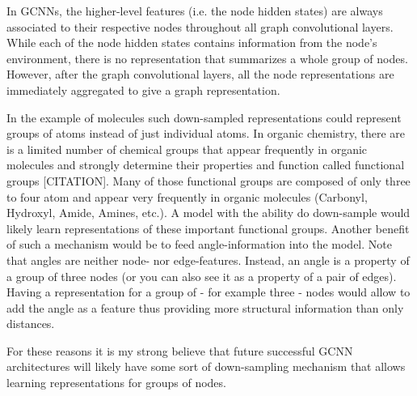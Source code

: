 In GCNNs, the higher-level features (i.e. the node hidden states) are always associated to their respective nodes throughout all graph convolutional layers. While each of the node hidden states contains information from the node's environment, there is no representation that summarizes a whole group of nodes. However, after the graph convolutional layers, all the node representations are immediately aggregated to give a graph representation.

In the example of molecules such down-sampled representations could represent groups of atoms instead of just individual atoms. In organic chemistry, there are is a limited number of chemical groups that appear frequently in organic molecules and strongly determine their properties and function called functional groups [CITATION]. Many of those functional groups are composed of only three to four atom and appear very frequently in organic molecules (Carbonyl, Hydroxyl, Amide, Amines, etc.). A model with the ability do down-sample would likely learn representations of these important functional groups. Another benefit of such a mechanism would be to feed angle-information into the model. Note that angles are neither node- nor edge-features. Instead, an angle is a property of a group of three nodes (or you can also see it as a property of a pair of edges). Having a representation for a group of - for example three - nodes would allow to add the angle as a feature thus providing more structural information than only distances.

For these reasons it is my strong believe that future successful GCNN architectures will likely have some sort of down-sampling mechanism that allows learning representations for groups of nodes.


